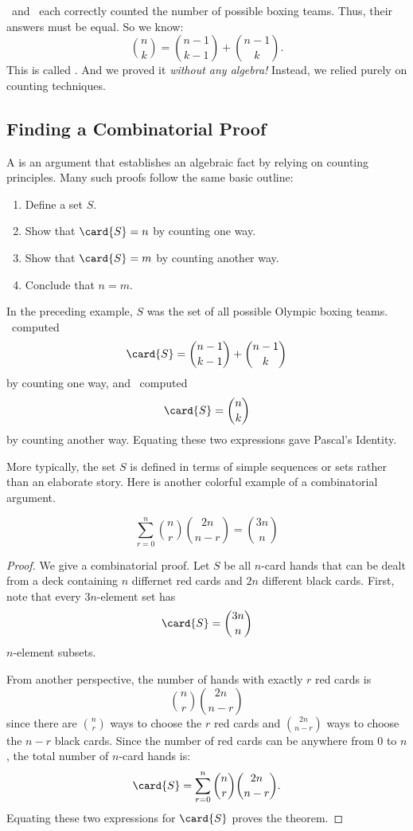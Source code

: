 \Jer\ and \Jay\ each correctly counted the number of possible boxing
teams.  Thus, their answers must be equal.  So we know:
%
\[
    \binom{n}{k} = \binom{n-1}{k-1} + \binom{n - 1}{k}.
\]
%
This is called .  And we proved it
\emph{without any algebra!}  Instead, we relied purely on counting
techniques.

\subsection{Finding a Combinatorial Proof}

A  is an argument that establishes an
algebraic fact by relying on counting principles.  Many such proofs
follow the same basic outline:
%
\begin{enumerate}

\item Define a set $S$.

\item Show that $\card{S} = n$ by counting one way.

\item Show that $\card{S} = m$ by counting another way.

\item Conclude that $n = m$.

\end{enumerate}
%
In the preceding example, $S$ was the set of all possible Olympic boxing
teams.  \Jay\ computed
\[
\card{S} = \binom{n-1}{k-1} + \binom{n-1}{k}
\]
by counting one way, and \Jer\ computed
\[
\card{S} = \binom{n}{k}
\]
by counting another way.  Equating these two expressions gave Pascal's
Identity.

More typically, the set $S$ is defined in terms of simple sequences or
sets rather than an elaborate story.  Here is another colorful example
of a combinatorial argument.

\begin{theorem}
\label{th:comb-ex}
\[
\sum_{r=0}^n \binom{n}{r} \binom{2n}{n-r} = \binom{3n}{n}
\]
\end{theorem}

\begin{proof}
We give a combinatorial proof.  Let $S$ be all $n$-card hands that can
be dealt from a deck containing $n$ differnet red cards and $2n$
different black cards.  First, note that every $3n$-element set has
%
\[
\card{S} = \binom{3n}{n}
\]
%
$n$-element subsets.

From another perspective, the number of hands with exactly $r$ red
cards is
%
\[
\binom{n}{r} \binom{2n}{n - r}
\]
%
since there are $\binom{n}{r}$ ways to choose the $r$ red cards and
$\binom{2n}{n - r}$ ways to choose the $n - r$ black cards.  Since the
number of red cards can be anywhere from 0 to $n$, the total number of
$n$-card hands is:
%
\[
    \card{S} = \sum_{r=0}^n \binom{n}{r} \binom{2n}{n-r}.
\]
%
Equating these two expressions for $\card{S}$ proves the theorem.
\end{proof}

